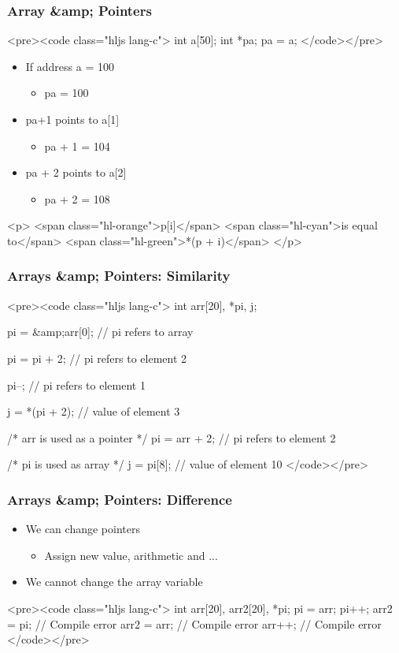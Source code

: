 \documentclass{../c-lecture}
\begin{document}
\begin{frame}
  \frametitle{Array &amp; Pointers}
  <pre><code class="hljs lang-c">
int a[50];
int *pa;
pa = a;
  </code></pre>
  \begin{itemize}
    \item If address a = 100
    \begin{itemize}
      \item pa = 100
    \end{itemize}
    \item pa+1 points to a[1]
    \begin{itemize}
      \item pa + 1 = 104
    \end{itemize}
    \item pa + 2 points to a[2]
    \begin{itemize}
      \item pa + 2 = 108
    \end{itemize}
  \end{itemize}
  <p>
    <span class="hl-orange">p[i]</span>
    <span class="hl-cyan">is equal to</span>
    <span class="hl-green">*(p + i)</span>
  </p>
\end{frame}
\begin{frame}
  \frametitle{Arrays &amp; Pointers: Similarity}
  <pre><code class="hljs lang-c">
int arr[20], *pi, j;

pi = &amp;arr[0]; // pi refers to array

pi = pi + 2; // pi refers to element 2

pi--; // pi refers to element 1

j = *(pi + 2); // value of element 3

/* arr is used as a pointer */
pi = arr + 2; // pi refers to element 2

/* pi is used as array */
j = pi[8]; // value of element 10
  </code></pre>
\end{frame}
\begin{frame}
  \frametitle{Arrays &amp; Pointers: Difference}
  \begin{itemize}
    \item We can change pointers
    \begin{itemize}
      \item Assign new value, arithmetic and ...
    \end{itemize}
    \item We cannot change the array variable
  \end{itemize}
  <pre><code class="hljs lang-c">
int arr[20], arr2[20], *pi;
pi = arr;
pi++;
arr2 = pi; // Compile error
arr2 = arr; // Compile error
arr++; // Compile error
  </code></pre>
\end{frame}
\end{document}
